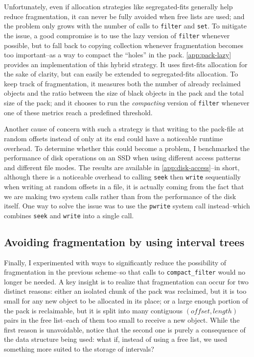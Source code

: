 \bigskip
Unfortunately, even if allocation strategies like segregated-fits generally help reduce fragmentation, it can never be fully avoided when free lists are used; and the problem only grows with the number of calls to \texttt{filter} and \texttt{set}. To mitigate the issue, a good compromise is to use the lazy version of \texttt{filter} whenever possible, but to fall back to copying collection whenever fragmentation becomes too important--as a way to compact the ``holes'' in the pack. \cref{app:pack-lazy} provides an implementation of this hybrid strategy. It uses first-fits allocation for the sake of clarity, but can easily be extended to segregated-fits allocation. To keep track of fragmentation, it measures both the number of already reclaimed objects and the ratio between the size of black objects in the pack and the total size of the pack; and it chooses to run the \emph{compacting} version of \texttt{filter} whenever one of these metrics reach a predefined threshold.

Another cause of concern with such a strategy is that writing to the pack-file at random offsets instead of only at its end could have a noticeable runtime overhead. To determine whether this could become a problem, I benchmarked the performance of disk operations on an SSD when using different access patterns and different file modes. The results are available in \cref{app:disk-access}--in short, although there is a noticeable overhead to calling \texttt{seek} then \texttt{write} sequentially when writing at random offsets in a file, it is actually coming from the fact that we are making two system calls rather than from the performance of the disk itself. One way to solve the issue was to use the \texttt{pwrite} system call instead--which combines \texttt{seek} and \texttt{write} into a single call.

\subsection{Avoiding fragmentation by using interval trees}

Finally, I experimented with ways to significantly reduce the possibility of fragmentation in the previous scheme--so that calls to \texttt{compact\_filter} would no longer be needed. A key insight is to realize that fragmentation can occur for two distinct reasons: either an isolated chunk of the pack was reclaimed, but it is too small for any new object to be allocated in its place; or a large enough portion of the pack is reclaimable, but it is split into many contiguous \((offset, length)\) pairs in the free list--each of them too small to receive a new object. While the first reason is unavoidable, notice that the second one is purely a consequence of the data structure being used: what if, instead of using a free list, we used something more suited to the storage of intervals?

